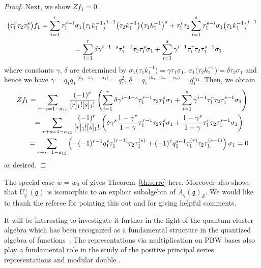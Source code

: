 \documentclass[pdftex]{sigma}
\newcommand{\geh}{\mathfrak{g}}
\begin{document}
\begin{proof}
Next, we show $Z f_1=0$.
\begin{gather*}
\big(\tau_1^r \tau_2 \tau_1^s\big) f_1
= \sum_{i=1}^r \tau_1^{r-i} \sigma_1 \big(\tau_1 k_1^{-1}\big)^{i-1}\big(\tau_2 k_1^{-1}\big) \big(\tau_1 k_1^{-1}\big)^s
+\tau_1^r \tau_2 \sum_{i=1}^s \tau_1^{s-i} \sigma_1 \big(\tau_1 k_1^{-1}\big)^{i-1}\\
\hphantom{\big(\tau_1^r \tau_2 \tau_1^s\big) f_1}{}
= \sum_{i=1}^r \delta \gamma^{i-1-s}\tau_1^{r-1} \tau_2 \tau_1^{s}\sigma_1
+\sum_{i=1}^s \gamma^{i-1}\tau_1^{r} \tau_2 \tau_1^{s-1}\sigma_1,
\end{gather*}
where constants $\gamma$, $\delta$ are determined by $\sigma_1 \big(\tau_1 k_1^{-1}\big)=\gamma \tau_1 \sigma_1$,
$\sigma_1 \big(\tau_2 k_1^{-1}\big)=\delta \tau_2 \sigma_1$ and hence we have
$\gamma=q_1 q_1^{-\langle h_1, \varpi_1-\alpha_1 \rangle}=q_1^2$,
$\delta=q_1^{-\langle h_1, \varpi_2-\alpha_2 \rangle}=q_1^{a_{12}}$.
Then, we obtain
\begin{gather*}
Z f_1
 =\sum_{r+s=1-a_{12}} \frac{(-1)^r}{[r]_1![s]_1!}
\left(\sum_{i=1}^r \delta \gamma^{i-1+s}\tau_1^{r-1} \tau_2 \tau_1^{s}\sigma_1
+\sum_{i=1}^s \gamma^{i-1}\tau_1^{r} \tau_2 \tau_1^{s-1}\sigma_1\right)\\
\hphantom{Z f_1}{}
 =\sum_{r+s=1-a_{12}} \frac{(-1)^r}{[r]_1![s]_1!}
\left(\delta \gamma^{s}\frac{1-\gamma^r}{1-\gamma}\tau_1^{r-1} \tau_2 \tau_1^{s}\sigma_1
+\frac{1-\gamma^s}{1-\gamma}\tau_1^{r} \tau_2 \tau_1^{s-1}\sigma_1\right)\\
\hphantom{Z f_1}{}
 =\sum_{r+s=1-a_{12}} \left(-(-1)^{r-1}q_1^s\tau_1^{(r-1)} \tau_2 \tau_1^{(s)}
+(-1)^r q_1^{s-1}\tau_1^{(r)} \tau_2 \tau_1^{(s-1)}\right)\sigma_1=0
\end{gather*}
as desired.
\end{proof}

\begin{remark}
The special case $w=w_0$ of \cite[Theorem 3.7]{Yak} gives
Theorem~\ref{th:serre} here.
Moreover \cite[Theorem~3.7]{Yak} also
shows that
$U_q^+(\geh)$ is isomorphic to an explicit subalgebra of $A_q(\geh)_
\mathcal{S}$.
We would like to thank the referee for pointing this out and for
giving helpful comments.
\end{remark}

It will be interesting to investigate it further in the light of the
quantum cluster algebra which has been recognized as a
fundamental structure in the quantized algebra of functions~\cite{GLS}.
The representations via multiplication on PBW bases also play a
fundamental role in the study of the positive principal series representations
and  modular double \cite{Ip}.
\end{document}
